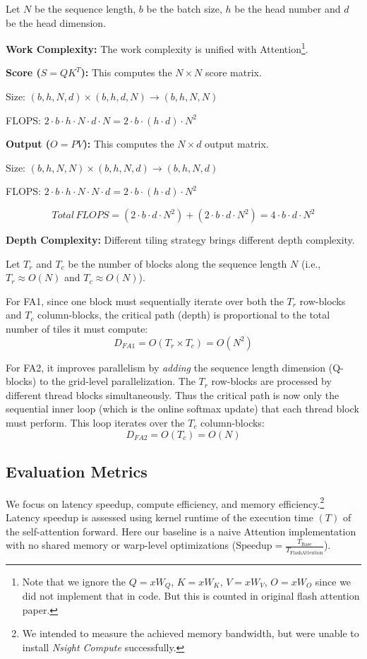 \documentclass[11pt]{article}
\begin{document}
Let $N$ be the sequence length, $b$ be the batch size, $h$ be the head number and $d$ be the head dimension.

\textbf{Work Complexity: } The work complexity is unified with Attention\footnote{Note that we ignore the $Q=xW_Q$, $K=xW_K$, $V=xW_V$, $O=xW_O$ since we did not implement that in code. But this is counted in original flash attention paper.}.


\textbf{Score ($S = QK^T$):} This computes the $N \times N$ score matrix.

Size: $(b, h, N, d) \times (b, h, d, N) \rightarrow (b, h, N, N)$

FLOPS: $2 \cdot b \cdot h \cdot N \cdot d \cdot N = 2 \cdot b \cdot (h \cdot d) \cdot N^2$

\textbf{Output ($O = PV$):} This computes the $N \times d$ output matrix.

Size: $(b, h, N, N) \times (b, h, N, d) \rightarrow (b, h, N, d)$

FLOPS: $2 \cdot b \cdot h \cdot N \cdot N \cdot d = 2 \cdot b \cdot (h \cdot d) \cdot N^2$

$$ Total\, FLOPS = (2 \cdot b \cdot d \cdot N^2) + (2 \cdot b \cdot d \cdot N^2) = 4 \cdot b \cdot d \cdot N^2 $$


\textbf{Depth Complexity: }
Different tiling strategy brings different depth complexity.

Let $T_r$ and $T_c$ be the number of blocks along the sequence length $N$ (i.e., $T_r \approx O(N)$ and $T_c \approx O(N)$).


For FA1, since one block must sequentially iterate over both the $T_r$ row-blocks and $T_c$ column-blocks, the critical path (depth) is proportional to the total number of tiles it must compute:
              \[ D_{FA1} = O(T_r \times T_c) = O(N^2) \]

For FA2, it improves parallelism by \textit{adding} the sequence length dimension (Q-blocks) to the grid-level parallelization. The $T_r$ row-blocks are processed by different thread blocks simultaneously. Thus the critical path is now only the sequential inner loop (which is the online softmax update) that each thread block must perform. This loop iterates over the $T_c$ column-blocks:
              \[ D_{FA2} = O(T_c) = O(N) \]



\subsection{Evaluation Metrics}
We focus on latency speedup, compute efficiency, and memory efficiency.\footnote{We intended to measure the achieved memory bandwidth, but were unable to install \textit{Nsight Compute} successfully.} Latency speedup is assessed using kernel runtime of the execution time $(T)$ of the self-attention forward. Here our baseline is a naive Attention implementation with no shared memory or warp-level optimizations ($\text{Speedup} = \frac{T_{\text{Base}}}{T_{\text{FlashAttention}}}$).
\end{document}
